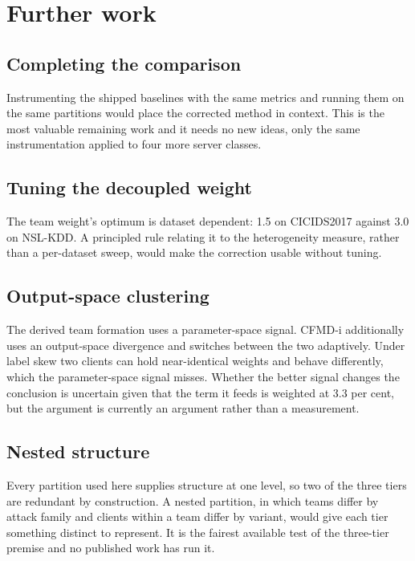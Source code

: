 \section{Further work}
\label{sec:further-work}

\subsection{Completing the comparison}

Instrumenting the shipped baselines with the same metrics and running them on
the same partitions would place the corrected method in context. This is the
most valuable remaining work and it needs no new ideas, only the same
instrumentation applied to four more server classes.

\subsection{Tuning the decoupled weight}

The team weight's optimum is dataset dependent: 1.5 on CICIDS2017 against 3.0
on NSL-KDD. A principled rule relating it to the heterogeneity measure, rather
than a per-dataset sweep, would make the correction usable without tuning.

\subsection{Output-space clustering}

The derived team formation uses a parameter-space signal. CFMD-i additionally
uses an output-space divergence and switches between the two adaptively. Under
label skew two clients can hold near-identical weights and behave differently,
which the parameter-space signal misses. Whether the better signal changes the
conclusion is uncertain given that the term it feeds is weighted at 3.3 per
cent, but the argument is currently an argument rather than a measurement.

\subsection{Nested structure}

Every partition used here supplies structure at one level, so two of the three
tiers are redundant by construction. A nested partition, in which teams differ
by attack family and clients within a team differ by variant, would give each
tier something distinct to represent. It is the fairest available test of the
three-tier premise and no published work has run it.


